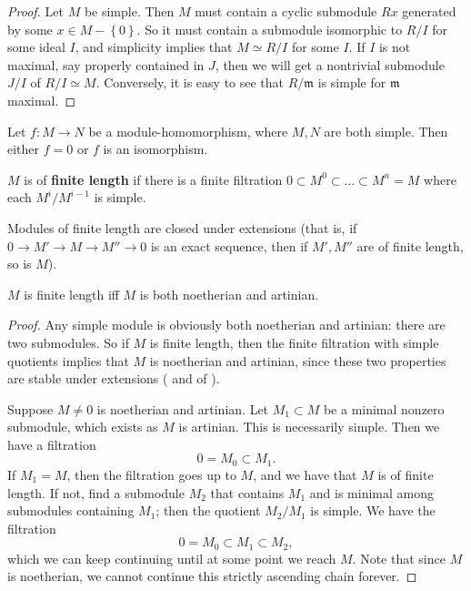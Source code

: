\begin{proof} Let $M$ be simple. Then 
$M$ must contain a cyclic submodule $Rx$ generated by some $x \in
M - \left\{0\right\}$. So it must contain a submodule isomorphic to $R/I$
for some ideal $I$, and
simplicity implies that $M \simeq R/I$ for some $I$. If $I$ is not maximal,
say properly contained in $J$,
then we will get a nontrivial submodule $J/I$ of $R/I \simeq M$. Conversely,
it is easy to see
that $R/\mathfrak{m}$ is simple for $\mathfrak{m}$ maximal.
\end{proof} 


\begin{exercise} Let $f: M \to N$ be a module-homomorphism,
where $M, N$ are both simple. Then either $f =0$ or $f$ is an isomorphism. 
\end{exercise} 

\begin{definition} 
$M$ is of \textbf{finite length} if there is a finite filtration $0 \subset M^0
\subset \dots \subset M^n = M$ where each $M^i/M^{i-1}$ is simple.
\end{definition} 

\begin{exercise} 
Modules of finite length are closed under extensions (that is, if $0 \to M'
\to M \to M'' \to 0$ is an exact sequence, then if $M', M''$ are of finite
length, so is $M$).  
\end{exercise} 

\begin{proposition} 
$M$ is finite length iff $M$ is both noetherian and artinian.
\end{proposition} 
\begin{proof} 
Any simple module is obviously both noetherian and artinian: there are two
submodules. So if $M$ is finite length, then the finite filtration with simple
quotients implies that $M$ is noetherian and artinian, since these two
properties are stable under extensions (
and  of ).

Suppose $M \neq 0$ is noetherian and artinian. Let $M_1 \subset M$ be a minimal
nonzero submodule, which exists as $M$ is artinian. This is necessarily simple. Then we have a filtration
\[ 0 = M_0 \subset M_1.  \]
If $M_1 = M$, then the filtration goes up to $M$, and we have that $M$ is of
finite length. If not, find a submodule $M_2$ that contains $M_1$ and is
minimal among submodules containing $M_1$; then the quotient
$M_2/M_1$ is simple. We have the filtration
\[ 0 = M_0 \subset M_1 \subset M_2,  \]
which we can keep continuing until at some point we reach $M$. Note that since
$M$ is noetherian, we cannot continue this strictly ascending chain forever. 
\end{proof} 

